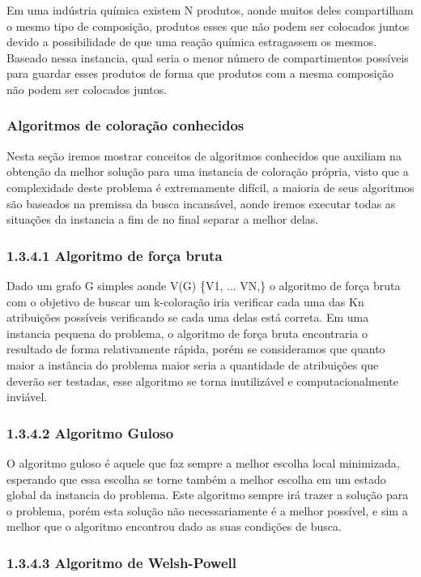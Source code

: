 \documentclass[12pt]{article}
\begin{document}
   Em uma indústria química existem N produtos, aonde muitos deles compartilham o mesmo tipo de composição, produtos esses que não podem ser colocados juntos devido a possibilidade de que uma reação química estragassem os mesmos. Baseado nessa instancia, qual seria o menor número de compartimentos possíveis para guardar esses produtos de forma que produtos com a mesma composição não podem ser colocados juntos.

	\subsubsection{Algoritmos de coloração conhecidos}
	
	Nesta seção iremos mostrar conceitos de algoritmos conhecidos que auxiliam na obtenção da melhor solução para uma instancia de coloração própria, visto que a complexidade deste problema é extremamente difícil, a maioria de seus algoritmos são baseados na premissa da busca incansável, aonde iremos executar todas as situações da instancia a fim de no final separar a melhor delas.
	
\subsubsection*{1.3.4.1 Algoritmo de força bruta}
 Dado um grafo G simples aonde V(G) \{V1, ... VN,\} o algoritmo de força bruta com o objetivo de buscar um k-coloração iria verificar cada uma das Kn atribuições possíveis verificando se cada uma delas está correta. Em uma instancia pequena do problema, o algoritmo de força bruta encontraria o resultado de forma relativamente rápida, porém se consideramos que quanto maior a instância do problema maior seria a quantidade de atribuições que deverão ser testadas, esse algoritmo se torna inutilizável e computacionalmente inviável.
 	
 \subsubsection*{1.3.4.2 Algoritmo Guloso}
 	
 	O algoritmo guloso é aquele que faz sempre a melhor escolha local minimizada, esperando que essa escolha se torne também a melhor escolha em um estado global da instancia do problema.
 	Este algoritmo sempre irá trazer a solução para o problema, porém esta solução não necessariamente é a melhor possível, e sim a melhor que o algoritmo encontrou dado as suas condições de busca.
 	
 	 
  \subsubsection*{1.3.4.3 Algoritmo de Welsh-Powell}
  
\end{document}
